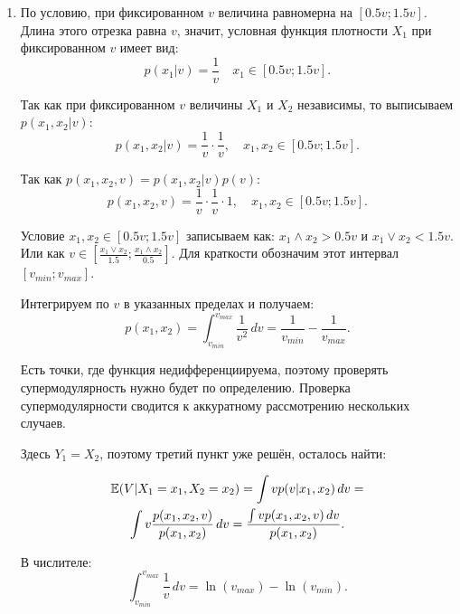 \begin{enumerate}


\item  По условию, при фиксированном $ v $ величина равномерна на $ [0.5v;1.5v] $. Длина этого отрезка равна $ v $, значит, условная функция плотности $ X_{1} $ при фиксированном $ v $ имеет вид: 
\begin{equation}
p(x_{1}|v)=\frac{1}{v}\quad x_{1}\in [0.5v;1.5v].
\end{equation}


Так как при фиксированном $ v $ величины $X_{1}  $ и $ X_{2} $ независимы, то выписываем $ p(x_{1},x_{2}|v) $:
\begin{equation}
p(x_{1},x_{2}|v)=\frac{1}{v}\cdot \frac{1}{v}, \quad x_{1},x_{2}\in [0.5v;1.5v].
\end{equation}

Так как $ p(x_{1},x_{2},v)=p(x_{1},x_{2}|v)p(v) $:
\begin{equation}
p(x_{1},x_{2},v)=\frac{1}{v}\cdot \frac{1}{v}\cdot 1, \quad x_{1},x_{2}\in [0.5v;1.5v].
\end{equation}

Условие $ x_{1},x_{2}\in [0.5v;1.5v] $ записываем как: $ x_{1}\wedge x_{2} > 0.5v $ и $ x_{1}\vee x_{2} <1.5v $. Или как $ v\in [\frac{x_{1}\vee x_{2}}{1.5};\frac{x_{1}\wedge x_{2}}{0.5}] $. Для краткости обозначим этот интервал $[v_{min};v_{max}]$.

Интегрируем по $ v $ в указанных пределах и получаем:
\begin{equation}
p(x_{1},x_{2})=\int_{v_{min}}^{v_{max}}\frac{1}{v^{2}} \, dv=
\frac{1}{v_{min}}-\frac{1}{v_{max}}.
\end{equation}

Есть точки, где функция недифференциируема, поэтому проверять супермодулярность нужно будет по определению. Проверка супермодулярности сводится к аккуратному рассмотрению нескольких случаев.

Здесь $ Y_{1}=X_{2} $, поэтому третий пункт уже решён, осталось найти:

\begin{multline}
\operatorname{\mathbb{E}}(V|X_{1}=x_{1}, X_{2}=x_{2})=\int v p(v|x_{1},x_{2}) \, dv=\\
\int v \frac{p(x_{1},x_{2},v)}{p(x_{1},x_{2})} \, dv=
\frac{\int v p(x_{1},x_{2},v) \, dv }{p(x_{1},x_{2})}.
\end{multline}

В числителе:
\begin{equation}
\int_{v_{min}}^{v_{max}}\frac{1}{v} \, dv=\ln(v_{max})-\ln(v_{min}).
\end{equation}


\end{enumerate}
